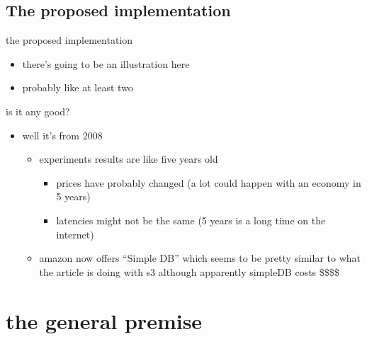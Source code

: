 \documentclass{beamer}
\begin{document}
\subsection{The proposed implementation}
  \begin{frame}{the proposed implementation}
    \begin{itemize}
      \item
        there's going to be an illustration here
      \item
        probably like at least two
    \end{itemize}
  \end{frame}

  \begin{frame}{is it any good?}
    \begin{itemize}
      \item
        well it's from 2008
        \begin{itemize}
        \item
          experiments results are like five years old
          \begin{itemize}
          \item
            prices have probably changed (a lot could happen with an economy in 5 years)
          \item 
            latencies might not be the same (5 years is a long time on the internet)
          \end{itemize}
        \item
          amazon now offers ``Simple DB'' which seems to be pretty similar to what the article is doing with s3 although apparently simpleDB costs \$\$\$\$
        \end{itemize}
      \end{itemize}
    \end{frame}

\section{the general premise}
\end{document}
